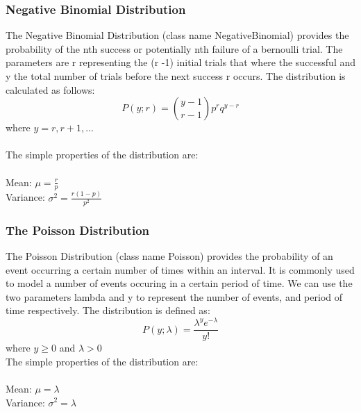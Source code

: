\subsubsection*{Negative Binomial Distribution}
The Negative Binomial Distribution (class name NegativeBinomial) provides the probability of the nth success or potentially nth failure of a bernoulli trial. The parameters are r representing the (r -1) initial trials that where the successful and y the total number of trials before the next success r occurs. The distribution is calculated as follows:
$$
P(y;r) = {y - 1 \choose r - 1}p^rq^{y-r} 
$$
where $y = r, r + 1, ...$\\\\
The simple properties of the distribution are:\\\\
Mean: $\mu = \frac{r}{p}$\\
Variance: $\sigma^2 = \frac{r(1-p)}{p^2}$

\subsubsection*{The Poisson Distribution}
The Poisson Distribution (class name Poisson) provides the probability of an event occurring a certain number of times within an interval. It is commonly used to model a number of events occuring in a certain period of time. We can use the two parameters lambda and y to represent the number of events, and period of time respectively.
The distribution is defined as:
$$
P(y;\lambda) = \frac{ \lambda^y e^{-\lambda} }{ y! }
$$
where $y \ge 0$ and $\lambda > 0$\\
The simple properties of the distribution are:\\\\
Mean: $\mu = \lambda$\\
Variance: $\sigma^2 = \lambda$

